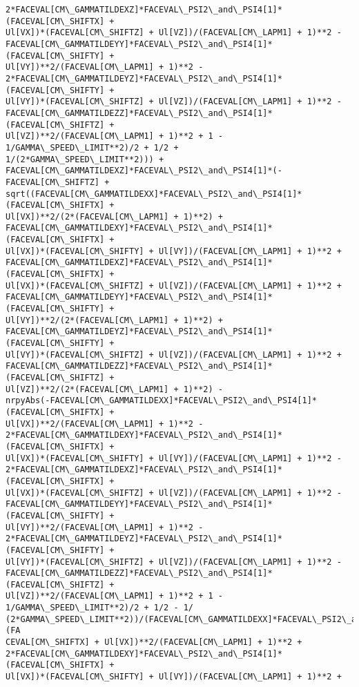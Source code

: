 \documentclass[landscape,letterpaper,10pt,english]{article}
\begin{document}
\begin{Verbatim}[commandchars=\\\{\}]
2*FACEVAL[CM\_GAMMATILDEXZ]*FACEVAL\_PSI2\_and\_PSI4[1]*(FACEVAL[CM\_SHIFTX] +
Ul[VX])*(FACEVAL[CM\_SHIFTZ] + Ul[VZ])/(FACEVAL[CM\_LAPM1] + 1)**2 -
FACEVAL[CM\_GAMMATILDEYY]*FACEVAL\_PSI2\_and\_PSI4[1]*(FACEVAL[CM\_SHIFTY] +
Ul[VY])**2/(FACEVAL[CM\_LAPM1] + 1)**2 -
2*FACEVAL[CM\_GAMMATILDEYZ]*FACEVAL\_PSI2\_and\_PSI4[1]*(FACEVAL[CM\_SHIFTY] +
Ul[VY])*(FACEVAL[CM\_SHIFTZ] + Ul[VZ])/(FACEVAL[CM\_LAPM1] + 1)**2 -
FACEVAL[CM\_GAMMATILDEZZ]*FACEVAL\_PSI2\_and\_PSI4[1]*(FACEVAL[CM\_SHIFTZ] +
Ul[VZ])**2/(FACEVAL[CM\_LAPM1] + 1)**2 + 1 - 1/GAMMA\_SPEED\_LIMIT**2)/2 + 1/2 +
1/(2*GAMMA\_SPEED\_LIMIT**2))) +
FACEVAL[CM\_GAMMATILDEXZ]*FACEVAL\_PSI2\_and\_PSI4[1]*(-FACEVAL[CM\_SHIFTZ] +
sqrt((FACEVAL[CM\_GAMMATILDEXX]*FACEVAL\_PSI2\_and\_PSI4[1]*(FACEVAL[CM\_SHIFTX] +
Ul[VX])**2/(2*(FACEVAL[CM\_LAPM1] + 1)**2) +
FACEVAL[CM\_GAMMATILDEXY]*FACEVAL\_PSI2\_and\_PSI4[1]*(FACEVAL[CM\_SHIFTX] +
Ul[VX])*(FACEVAL[CM\_SHIFTY] + Ul[VY])/(FACEVAL[CM\_LAPM1] + 1)**2 +
FACEVAL[CM\_GAMMATILDEXZ]*FACEVAL\_PSI2\_and\_PSI4[1]*(FACEVAL[CM\_SHIFTX] +
Ul[VX])*(FACEVAL[CM\_SHIFTZ] + Ul[VZ])/(FACEVAL[CM\_LAPM1] + 1)**2 +
FACEVAL[CM\_GAMMATILDEYY]*FACEVAL\_PSI2\_and\_PSI4[1]*(FACEVAL[CM\_SHIFTY] +
Ul[VY])**2/(2*(FACEVAL[CM\_LAPM1] + 1)**2) +
FACEVAL[CM\_GAMMATILDEYZ]*FACEVAL\_PSI2\_and\_PSI4[1]*(FACEVAL[CM\_SHIFTY] +
Ul[VY])*(FACEVAL[CM\_SHIFTZ] + Ul[VZ])/(FACEVAL[CM\_LAPM1] + 1)**2 +
FACEVAL[CM\_GAMMATILDEZZ]*FACEVAL\_PSI2\_and\_PSI4[1]*(FACEVAL[CM\_SHIFTZ] +
Ul[VZ])**2/(2*(FACEVAL[CM\_LAPM1] + 1)**2) -
nrpyAbs(-FACEVAL[CM\_GAMMATILDEXX]*FACEVAL\_PSI2\_and\_PSI4[1]*(FACEVAL[CM\_SHIFTX] +
Ul[VX])**2/(FACEVAL[CM\_LAPM1] + 1)**2 -
2*FACEVAL[CM\_GAMMATILDEXY]*FACEVAL\_PSI2\_and\_PSI4[1]*(FACEVAL[CM\_SHIFTX] +
Ul[VX])*(FACEVAL[CM\_SHIFTY] + Ul[VY])/(FACEVAL[CM\_LAPM1] + 1)**2 -
2*FACEVAL[CM\_GAMMATILDEXZ]*FACEVAL\_PSI2\_and\_PSI4[1]*(FACEVAL[CM\_SHIFTX] +
Ul[VX])*(FACEVAL[CM\_SHIFTZ] + Ul[VZ])/(FACEVAL[CM\_LAPM1] + 1)**2 -
FACEVAL[CM\_GAMMATILDEYY]*FACEVAL\_PSI2\_and\_PSI4[1]*(FACEVAL[CM\_SHIFTY] +
Ul[VY])**2/(FACEVAL[CM\_LAPM1] + 1)**2 -
2*FACEVAL[CM\_GAMMATILDEYZ]*FACEVAL\_PSI2\_and\_PSI4[1]*(FACEVAL[CM\_SHIFTY] +
Ul[VY])*(FACEVAL[CM\_SHIFTZ] + Ul[VZ])/(FACEVAL[CM\_LAPM1] + 1)**2 -
FACEVAL[CM\_GAMMATILDEZZ]*FACEVAL\_PSI2\_and\_PSI4[1]*(FACEVAL[CM\_SHIFTZ] +
Ul[VZ])**2/(FACEVAL[CM\_LAPM1] + 1)**2 + 1 - 1/GAMMA\_SPEED\_LIMIT**2)/2 + 1/2 - 1/
(2*GAMMA\_SPEED\_LIMIT**2))/(FACEVAL[CM\_GAMMATILDEXX]*FACEVAL\_PSI2\_and\_PSI4[1]*(FA
CEVAL[CM\_SHIFTX] + Ul[VX])**2/(FACEVAL[CM\_LAPM1] + 1)**2 +
2*FACEVAL[CM\_GAMMATILDEXY]*FACEVAL\_PSI2\_and\_PSI4[1]*(FACEVAL[CM\_SHIFTX] +
Ul[VX])*(FACEVAL[CM\_SHIFTY] + Ul[VY])/(FACEVAL[CM\_LAPM1] + 1)**2 +

\end{Verbatim}
\end{document}
